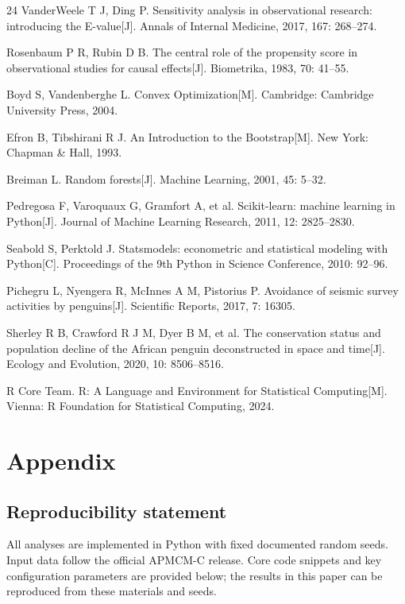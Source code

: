 \documentclass{apmcmthesis}
\begin{document}
\begin{thebibliography}{24}
 VanderWeele T J, Ding P. Sensitivity analysis in observational research: introducing the E-value[J]. Annals of Internal Medicine, 2017, 167: 268--274.

 Rosenbaum P R, Rubin D B. The central role of the propensity score in observational studies for causal effects[J]. Biometrika, 1983, 70: 41--55.

 Boyd S, Vandenberghe L. Convex Optimization[M]. Cambridge: Cambridge University Press, 2004.

 Efron B, Tibshirani R J. An Introduction to the Bootstrap[M]. New York: Chapman \& Hall, 1993.

 Breiman L. Random forests[J]. Machine Learning, 2001, 45: 5--32.

 Pedregosa F, Varoquaux G, Gramfort A, et al. Scikit-learn: machine learning in Python[J]. Journal of Machine Learning Research, 2011, 12: 2825--2830.

 Seabold S, Perktold J. Statsmodels: econometric and statistical modeling with Python[C]. Proceedings of the 9th Python in Science Conference, 2010: 92--96.

 Pichegru L, Nyengera R, McInnes A M, Pistorius P. Avoidance of seismic survey activities by penguins[J]. Scientific Reports, 2017, 7: 16305.

 Sherley R B, Crawford R J M, Dyer B M, et al. The conservation status and population decline of the African penguin deconstructed in space and time[J]. Ecology and Evolution, 2020, 10: 8506--8516.

 R Core Team. R: A Language and Environment for Statistical Computing[M]. Vienna: R Foundation for Statistical Computing, 2024.

\end{thebibliography}
\endgroup

\newpage
\section*{Appendix}

\subsection*{Reproducibility statement}

All analyses are implemented in Python with fixed documented random seeds. Input data follow the official APMCM-C release. Core code snippets and key configuration parameters are provided below; the results in this paper can be reproduced from these materials and seeds.
\end{document}
